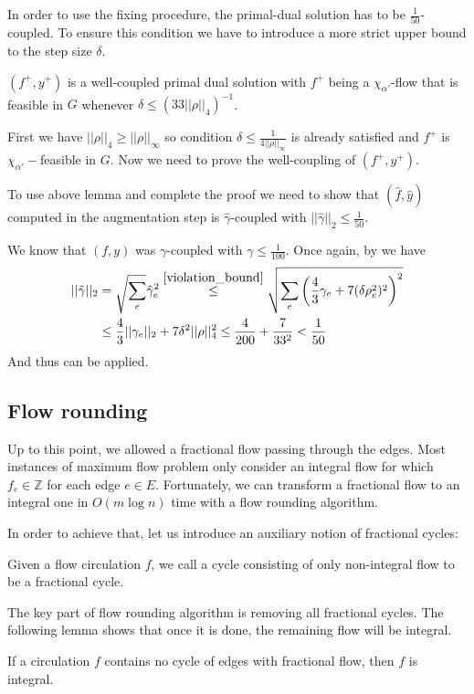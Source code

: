 In order to use the fixing procedure, the primal-dual solution has to be $\frac{1}{50}$-coupled. To ensure this condition we have to introduce a more strict upper bound to the step size $\delta$.
\begin{lemma} \label{step_upperbound}
$(f^+,y^+)$ is a well-coupled primal dual solution with $f^+$ being a $\chi_{\alpha'}$-flow that is feasible in $G$ whenever $\delta \le (33||\rho||_4)^{-1}$.
\end{lemma}
First we have $||\rho||_4 \ge ||\rho||_\infty$ so condition $\delta \le \frac{1}{4||\rho||_\infty}$ is already satisfied and $f^+$ is $\chi_{\alpha'}-$feasible in $G$.
Now we need to prove the well-coupling of $(f^+,y^+)$.

To use above lemma and complete the proof we need to show that $(\hat f,\hat y)$ computed in the augmentation step is $\hat{\gamma}$-coupled with $||\hat{\gamma}||_2 \le \frac{1}{50}$.

We know that $(f,y)$ was $\gamma$-coupled with $\gamma \le \frac{1}{100}$. Once again, by  we have
\begin{equation}
\begin{split}
||\hat{\gamma}||_2
&= \sqrt{\sum_e}\hat{\gamma}_e^2
\stackrel{\ref{violation_bound}}{\le} \sqrt{\sum_e\left(\frac{4}{3}\gamma_e+7(\delta\rho_e^2)^2\right)^2} \\
&\le \frac{4}{3}||\gamma_e||_2+7\delta^2||\rho||_4^2
\le \frac{4}{200}+\frac{7}{33^2} < \frac{1}{50}
\end{split}
\end{equation}
And thus  can be applied.

\subsection{Flow rounding}
Up to this point, we allowed a fractional flow passing through the edges. Most instances of maximum flow problem only consider an integral flow for which $f_e\in\mathbb{Z}$ for each edge $e\in E$. Fortunately, we can transform a fractional flow to an integral one in $O(m\log n)$ time with a flow rounding algorithm.

In order to achieve that, let us introduce an auxiliary notion of fractional cycles:
\begin{definition}
Given a flow circulation $f$, we call a cycle consisting of only non-integral flow to be a fractional cycle.
\end{definition}
The key part of flow rounding algorithm is removing all fractional cycles. The following lemma shows that once it is done, the remaining flow will be integral.
\begin{lemma}
If a circulation $f$ contains no cycle of edges with fractional flow, then $f$ is integral.
\end{lemma}

